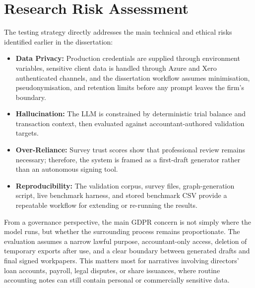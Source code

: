 \section{Research Risk Assessment}
The testing strategy directly addresses the main technical and ethical risks identified earlier in the dissertation:
\begin{itemize}
    \item \textbf{Data Privacy:} Production credentials are supplied through environment variables, sensitive client data is handled through Azure and Xero authenticated channels, and the dissertation workflow assumes minimisation, pseudonymisation, and retention limits before any prompt leaves the firm's boundary.
    \item \textbf{Hallucination:} The LLM is constrained by deterministic trial balance and transaction context, then evaluated against accountant-authored validation targets.
    \item \textbf{Over-Reliance:} Survey trust scores show that professional review remains necessary; therefore, the system is framed as a first-draft generator rather than an autonomous signing tool.
    \item \textbf{Reproducibility:} The validation corpus, survey files, graph-generation script, live benchmark harness, and stored benchmark CSV provide a repeatable workflow for extending or re-running the results.
\end{itemize}

From a governance perspective, the main GDPR concern is not simply where the model runs, but whether the surrounding process remains proportionate. The evaluation assumes a narrow lawful purpose, accountant-only access, deletion of temporary exports after use, and a clear boundary between generated drafts and final signed workpapers. This matters most for narratives involving directors' loan accounts, payroll, legal disputes, or share issuances, where routine accounting notes can still contain personal or commercially sensitive data.

